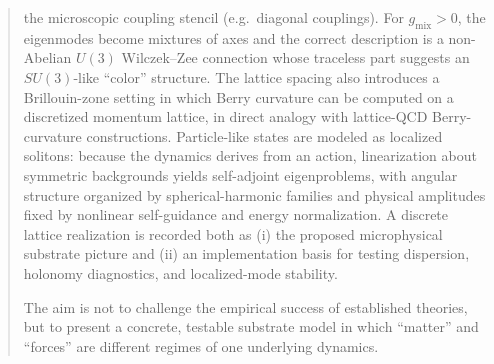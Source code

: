 \begin{abstract}
the microscopic coupling stencil (e.g.\ diagonal couplings).
For $g_{\mathrm{mix}}>0$, the eigenmodes become mixtures of axes and the correct description is a non-Abelian
$U(3)$ Wilczek--Zee connection whose traceless part suggests an $SU(3)$-like ``color'' structure.
The lattice spacing also introduces a Brillouin-zone setting in which Berry curvature can be computed on a
discretized momentum lattice, in direct analogy with lattice-QCD Berry-curvature constructions.
Particle-like states are modeled as localized solitons: because the dynamics derives from an action, linearization
about symmetric backgrounds yields self-adjoint eigenproblems, with angular structure organized by spherical-harmonic
families and physical amplitudes fixed by nonlinear self-guidance and energy normalization.
A discrete lattice realization is recorded both as (i) the proposed microphysical substrate picture and (ii) an
implementation basis for testing dispersion, holonomy diagnostics, and localized-mode stability.

The aim is not to challenge the empirical success of established theories, but to present a concrete, testable
substrate model in which ``matter'' and ``forces'' are different regimes of one underlying dynamics.
\end{abstract}

